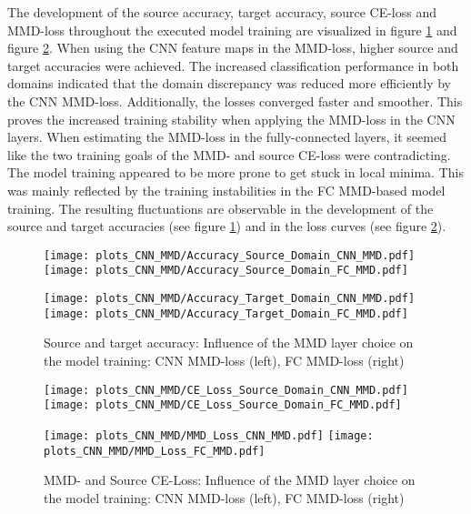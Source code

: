 The development of the source accuracy, target accuracy, source CE-loss and MMD-loss throughout the executed model training are visualized in figure \ref{fig:accuracy_cnn_and_no_cnn_mmd} and figure \ref{fig:loss_cnn_and_no_cnn_mmd}. When using the CNN feature maps in the MMD-loss, higher source and target accuracies were achieved. The increased classification performance in both domains indicated that the domain discrepancy was reduced more efficiently by the CNN MMD-loss. Additionally, the losses converged faster and smoother. This proves the increased training stability when applying the MMD-loss in the CNN layers. When estimating the MMD-loss in the fully-connected layers, it seemed like the two training goals of the MMD- and source CE-loss were contradicting. The model training appeared to be more prone to get stuck in local minima. This was mainly reflected by the training instabilities in the FC MMD-based model training. The resulting fluctuations are observable in the development of the source and target accuracies (see figure \ref{fig:accuracy_cnn_and_no_cnn_mmd}) and in the loss curves (see figure \ref{fig:loss_cnn_and_no_cnn_mmd}).

\begin{figure}[htp]
  \centering
  \texttt{[image: plots\_CNN\_MMD/Accuracy\_Source\_Domain\_CNN\_MMD.pdf]}
  \hspace{.3cm}
  \texttt{[image: plots\_CNN\_MMD/Accuracy\_Source\_Domain\_FC\_MMD.pdf]}

  \vspace{.1cm}

  \texttt{[image: plots\_CNN\_MMD/Accuracy\_Target\_Domain\_CNN\_MMD.pdf]}
  \hspace{.3cm}
  \texttt{[image: plots\_CNN\_MMD/Accuracy\_Target\_Domain\_FC\_MMD.pdf]}

  \caption{Source and target accuracy: Influence of the MMD layer choice on the model training: CNN MMD-loss (left), FC MMD-loss (right)}
  \label{fig:accuracy_cnn_and_no_cnn_mmd}
\end{figure}

\begin{figure}[H]
  \centering
  \texttt{[image: plots\_CNN\_MMD/CE\_Loss\_Source\_Domain\_CNN\_MMD.pdf]}
  \hspace{.3cm}
  \texttt{[image: plots\_CNN\_MMD/CE\_Loss\_Source\_Domain\_FC\_MMD.pdf]}

  \vspace{.1cm}

  \texttt{[image: plots\_CNN\_MMD/MMD\_Loss\_CNN\_MMD.pdf]}
  \hspace{.1cm}
  \texttt{[image: plots\_CNN\_MMD/MMD\_Loss\_FC\_MMD.pdf]}

  \caption{MMD- and Source CE-Loss: Influence of the MMD layer choice on the model training: CNN MMD-loss (left), FC MMD-loss (right)}
  \label{fig:loss_cnn_and_no_cnn_mmd}
\end{figure}

